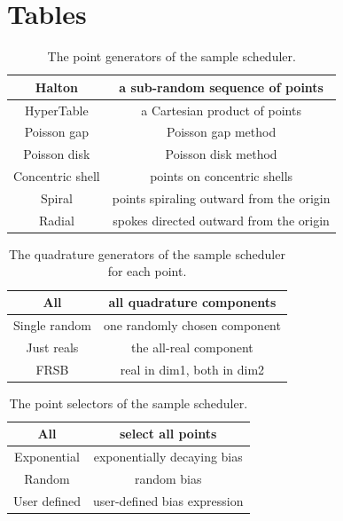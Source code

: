 \clearpage
\section{Tables}

\begin{table}[h]
  \begin{tabular}{ | c | c | }
    \hline
    Halton           &  a sub-random sequence of points             \\  \hline
    HyperTable       &  a Cartesian product of points               \\  \hline
    Poisson gap      &  Poisson gap method                          \\  \hline
    Poisson disk     &  Poisson disk method                         \\  \hline
    Concentric shell &  points on concentric shells                 \\  \hline
    Spiral           &  points spiraling outward from the origin    \\  \hline
    Radial           &  spokes directed outward from the origin     \\  \hline
  \end{tabular}
  \caption{The point generators of the sample scheduler.}
  \label{scheduler_point_generators}
\end{table}

\begin{table}[h]
  \begin{tabular}{ | c | c | }
    \hline
    All             &  all quadrature components        \\  \hline
    Single random   &  one randomly chosen component    \\  \hline
    Just reals      &  the all-real component           \\  \hline
    FRSB            &  real in dim1, both in dim2       \\  \hline
  \end{tabular}
  \caption{The quadrature generators of the sample scheduler for each point.}
  \label{scheduler_quadrature_generators}
\end{table}

\begin{table}[h]
  \begin{tabular}{ | c | c | }
    \hline
    All             &  select all points            \\  \hline
    Exponential     &  exponentially decaying bias  \\  \hline
    Random          &  random bias                  \\  \hline
    User defined    &  user-defined bias expression \\  \hline
  \end{tabular}
  \caption{The point selectors of the sample scheduler.}
  \label{scheduler_point_selectors}
\end{table}

